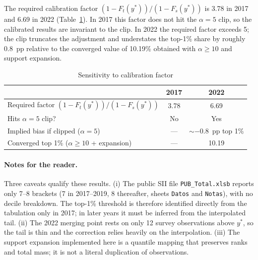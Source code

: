 The required calibration factor $(1-F_t(y^{*}))/(1-F_s(y^{*}))$ is 3.78 in 2017 and 6.69 in 2022 (Table~\ref{tab:bfm-sens-factor}). In 2017 this factor does not hit the $\alpha=5$ clip, so the calibrated results are invariant to the clip. In 2022 the required factor exceeds 5; the clip truncates the adjustment and understates the top-1\% share by roughly 0.8~pp relative to the converged value of 10.19\% obtained with $\alpha\ge10$ and support expansion.

\begin{table}[H]
\centering
\caption{Sensitivity to calibration factor}
\label{tab:bfm-sens-factor}
\small
\begin{tabular}{lcc}
\toprule
 & 2017 & 2022 \\
\midrule
Required factor $(1-F_t(y^{*}))/(1-F_s(y^{*}))$ & 3.78 & 6.69 \\
Hits $\alpha=5$ clip? & No & Yes \\
Implied bias if clipped ($\alpha=5$) & --- & $\sim -0.8$~pp top 1\% \\
Converged top 1\% ($\alpha\ge10$ + expansion) & --- & 10.19 \\
\bottomrule
\end{tabular}
\end{table}

\paragraph{Notes for the reader.}
Three caveats qualify these results. (i) The public SII file \texttt{PUB\_Total.xlsb} reports only 7--8 brackets (7 in 2017--2019, 8 thereafter, sheets \texttt{Datos} and \texttt{Notas}), with no decile breakdown. The top-1\% threshold is therefore identified directly from the tabulation only in 2017; in later years it must be inferred from the interpolated tail. (ii) The 2022 merging point rests on only 12 survey observations above $y^{*}$, so the tail is thin and the correction relies heavily on the interpolation. (iii) The support expansion implemented here is a quantile mapping that preserves ranks and total mass; it is not a literal duplication of observations.